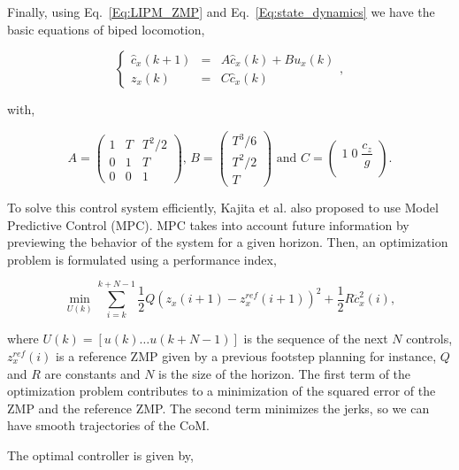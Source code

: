 Finally, using Eq.~\ref{Eq:LIPM_ZMP} and Eq.~\ref{Eq:state_dynamics} we have the basic equations of biped locomotion,

\begin{equation}
\label{Eq:basic_dynamic_equations}
\left\{
\begin{array}{ccc}
 \hat{c}_x(k+1) &=&  A \hat{c}_x(k) + B u_x(k)\\
 z_x(k) &=& C \hat{c}_x(k)
\end{array}
\right.,
\end{equation}

with,

\begin{equation*}
 A = \left(
\begin{matrix}
1 & T & T^2/2 \\
0 & 1 & T \\
0 & 0 & 1
\end{matrix}
\right) \text{, }
{ B} = \left(
\begin{matrix}
T^3/6 \\
T^2/2 \\
T
\end{matrix}
\right) \text{ and }
{ C} = \left(
\begin{matrix}
1 \; 0 \; \dfrac{c_z}{g} \\
\end{matrix}
\right).
\end{equation*}

To solve this control system efficiently, Kajita et al. also  proposed to use Model Predictive Control (MPC). MPC takes into account future information by previewing the behavior of the system for a given horizon. Then, an optimization problem is formulated using a performance index,

\begin{equation}
\label{Eq:Performance-Index}
\min_{U(k)} \sum\limits_{i=k}^{k+N - 1} \frac{1}{2} Q (z_x(i+1) - z_x^{ref}(i+1))^2 + \frac{1}{2}R\dddot{c}_x^2(i),
\end{equation}

where $U(k) = [u(k)\hdots u(k+N-1)]$ is the sequence of the next $N$ controls, $z_x^{ref}(i)$ is a reference ZMP given by a previous footstep planning for instance, $Q$ and $R$ are constants and $N$ is the size of the horizon. The first term of the optimization problem contributes to a minimization of the squared error of the ZMP and the reference ZMP. The second term minimizes the jerks, so we can have smooth trajectories of the CoM.

The optimal controller is given by,

